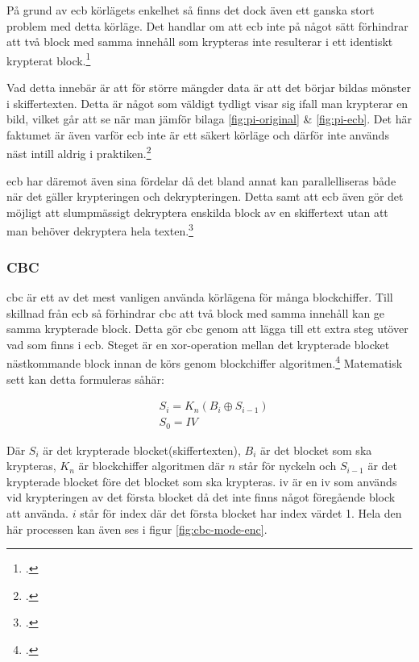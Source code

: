 På grund av \acrshort{ecb} körlägets enkelhet så finns det dock även ett ganska
stort problem med detta körläge. Det handlar om att \acrshort{ecb} inte på något
sätt förhindrar att två block med samma innehåll som krypteras inte resulterar i
ett identiskt krypterat block.\footcite{dworkin2001sp}

Vad detta innebär är att för större mängder data
är att det börjar bildas mönster i skiffertexten. Detta är något som väldigt
tydligt visar sig ifall man krypterar en bild, vilket går att se när man jämför
bilaga \ref{fig:pi-original} \& \ref{fig:pi-ecb}.
Det här faktumet är även varför \acrshort{ecb} inte är ett säkert körläge
och därför inte används näst intill aldrig i praktiken.\footcite{dworkin2001sp}

\acrshort{ecb} har däremot även sina fördelar då det bland annat kan parallelliseras
både när det gäller krypteringen och dekrypteringen. Detta samt att \acrshort{ecb}
även gör det möjligt att slumpmässigt dekryptera enskilda block av en skiffertext
utan att man behöver dekryptera hela texten.\footcite{dworkin2001sp}

\subsubsection{CBC}
\label{sec:cbc}
\acrlong{cbc} är ett av det mest vanligen använda körlägena för många blockchiffer.
Till skillnad från \acrshort{ecb} så förhindrar \acrshort{cbc} att två block med
samma innehåll kan ge samma krypterade block. Detta gör \acrshort{cbc} genom att
lägga till ett extra steg utöver vad som finns i \acrshort{ecb}. Steget
är en \gls{xor}-operation mellan det krypterade blocket nästkommande block innan
de körs genom blockchiffer algoritmen.\footcite{dworkin2001sp}
Matematisk sett kan detta formuleras såhär:

\begin{equation}
    \label{eq:cbc-encryption}
    \begin{aligned}
        &S_i = K_n(B_i \oplus S_{i-1})\\\nonumber
        &S_0 = IV
    \end{aligned}
\end{equation}

Där $S_i$ är det krypterade blocket(skiffertexten), $B_i$ är det blocket som ska krypteras,
$K_n$ är blockchiffer algoritmen där $n$ står för nyckeln och $S_{i-1}$ är
det krypterade blocket före det blocket som ska krypteras. \acrshort{iv} är en
\acrfull{iv} som används vid krypteringen av det första blocket då det inte finns
något föregående block att använda. $i$ står för index där det första blocket har
index värdet 1. Hela den här processen kan även ses i figur \ref{fig:cbc-mode-enc}.

